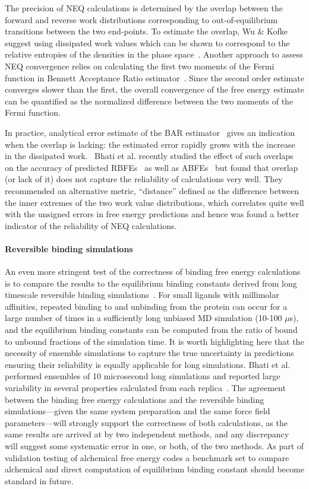 The precision of NEQ calculations is determined by the overlap between the forward and reverse work distributions corresponding to out-of-equilibrium transitions between the two end-points. To estimate the overlap, Wu \& Kofke suggest using dissipated work values which can be shown to correspond to the relative entropies of the densities in the phase space~\cite{wu2005phase}. Another approach to assess NEQ convergence relies on calculating the first two moments of the Fermi function in Bennett Acceptance Ratio estimator~\cite{hahn2010measuring}. Since the second order estimate converges slower than the first, the overall convergence of the free energy estimate can be quantified as the normalized difference between the two moments of the Fermi function. 

In practice, analytical error estimate of the BAR estimator~\cite{shirts2003equilibrium} gives an indication when the overlap is lacking: the estimated error rapidly grows with the increase in the dissipated work.~\cite{shirts2005comparison} Bhati et al. recently studied the effect of such overlaps on the accuracy of predicted RBFEs~\cite{wan2023eqvsneq} as well as ABFEs~\cite{bhati2025} but found that overlap (or lack of it) does not capture the reliability of calculations very well. They recommended an alternative metric, ``distance'' defined as the difference between the inner extremes of the two work value distributions, which correlates quite well with the unsigned errors in free energy predictions and hence was found a better indicator of the reliability of NEQ calculations. 

\paragraph{Reversible binding simulations}
An even more stringent test of the correctness of binding free energy calculations is to compare the results to the equilibrium binding constants derived from long timescale reversible binding simulations~\cite{pan2017quantitative}. For small ligands with millimolar affinities, repeated binding to and unbinding from the protein can occur for a large number of times in a sufficiently long unbiased MD simulation (10-100 $\mu$s), and the equilibrium binding constants can be computed from the ratio of bound to unbound fractions of the simulation time. 
It is worth highlighting here that the necessity of ensemble simulations to capture the true uncertainty in predictions ensuring their reliability is equally applicable for long simulations. Bhati et al. performed ensembles of 10 microsecond long simulations and reported large variability in several properties calculated from each replica~\cite{bhati2023}.
The agreement between the binding free energy calculations and the reversible binding simulations---given the same system preparation and the same force field parameters---will strongly support the correctness of both calculations, as the same results are arrived at by two independent methods, and any discrepancy will suggest some systematic error in one, or both, of the two methods. As part of validation testing of alchemical free energy codes a benchmark set to compare alchemical and direct computation of equilibrium binding constant should become standard in future.

